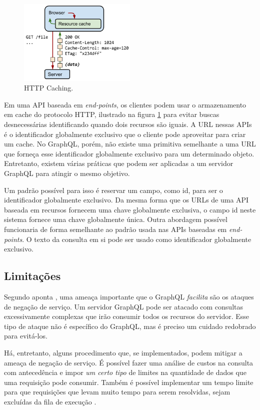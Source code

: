 \begin{figure}[htbp]
\centering
\includegraphics[width=0.5\textwidth]{figuras/cache-http.png}
\caption{HTTP Caching.}
\label{fig:cache-http}
\end{figure}

Em uma API baseada em \textit{end-points}, os clientes podem usar o armazenamento em cache do protocolo HTTP, ilustrado na figura \ref{fig:cache-http} para evitar buscas desnecessárias identificando quando dois recursos são iguais. A URL nessas APIs é o identificador globalmente exclusivo que o cliente pode aproveitar para criar um cache. No GraphQL, porém, não existe uma primitiva semelhante a uma URL que forneça esse identificador globalmente exclusivo para um determinado objeto. Entretanto, existem várias práticas que podem ser aplicadas a um servidor GraphQL para atingir o mesmo objetivo.

Um padrão possível para isso é reservar um campo, como \textup{id}, para ser o identificador globalmente exclusivo. Da mesma forma que os URLs de uma API baseada em recursos fornecem uma chave globalmente exclusiva, o campo \textup{id} neste sistema fornece uma chave globalmente única. Outra abordagem possível funcionaria de forma semelhante ao padrão usada nas APIs baseadas em \textit{end-points}. O texto da consulta em si pode ser usado como identificador globalmente exclusivo. 

\subsection{Limitações}

Segundo aponta , uma ameaça importante que o GraphQL \emph{facilita} são os ataques de negação de serviço. Um servidor GraphQL pode ser atacado com consultas excessivamente complexas que irão consumir todos os recursos do servidor. Esse tipo de ataque não é específico do GraphQL, mas é preciso um cuidado redobrado para evitá-los.

Há, entretanto, alguns procedimento que, se implementados, podem mitigar a ameaça de negação de serviço. É possível fazer uma análise de custos na consulta com antecedência e impor \emph{um certo tipo} de limites na quantidade de dados que uma requisição pode consumir. Também é possível implementar um tempo limite para que requisições que levam muito tempo para serem resolvidas, sejam excluídas da fila de execução .


